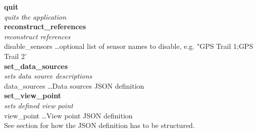 \textbf{quit} \\
\textit{quits the application} \\

\textbf{reconstruct\_references} \\
\textit{reconstruct references} \\
disable\_sensors \dots optional list of sensor names to disable, e.g. "GPS Trail 1;GPS Trail 2' \\

\textbf{set\_data\_sources} \\
\textit{sets data source descriptions} \\
data\_sources \dots Data sources JSON definition \\

\textbf{set\_view\_point} \\
\textit{sets defined view point} \\
view\_point \dots View point JSON definition \\
See section  for how the JSON definition has to be structured. \\








